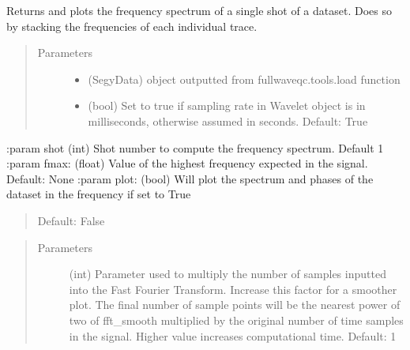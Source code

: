 \documentclass[letterpaper,10pt,english]{sphinxmanual}
\begin{document}

\begin{fulllineitems}
\label{\detokenize{index:fullwaveqc.siganalysis.dataspec}}
Returns and plots the frequency spectrum of a single shot of a dataset. Does so by stacking the frequencies of each
individual trace.
\begin{quote}\begin{description}
\item[{Parameters}] \leavevmode\begin{itemize}
\item {} 
 \textendash{} (SegyData)  object outputted from fullwaveqc.tools.load function

\item {} 
 \textendash{} (bool)      Set to true if sampling rate in Wavelet object is in milliseconds, otherwise assumed
in seconds. Default: True

\end{itemize}

\end{description}\end{quote}

:param  shot        (int)       Shot number to compute the frequency spectrum. Default 1
:param  fmax:       (float)     Value of the highest frequency expected in the signal. Default: None
:param  plot:       (bool)      Will plot the spectrum and phases of the dataset in the frequency if set to True
\begin{quote}

Default: False
\end{quote}
\begin{quote}\begin{description}
\item[{Parameters}] \leavevmode
{} \textendash{} (int)       Parameter used to multiply the number of samples inputted into the Fast Fourier
Transform. Increase this factor for a smoother plot. The final number of sample
points will be the nearest power of two of fft\_smooth multiplied by the original
number of time samples in the signal. Higher value increases computational time.
Default: 1


\end{description}
\end{quote}
\end{fulllineitems}
\end{document}
